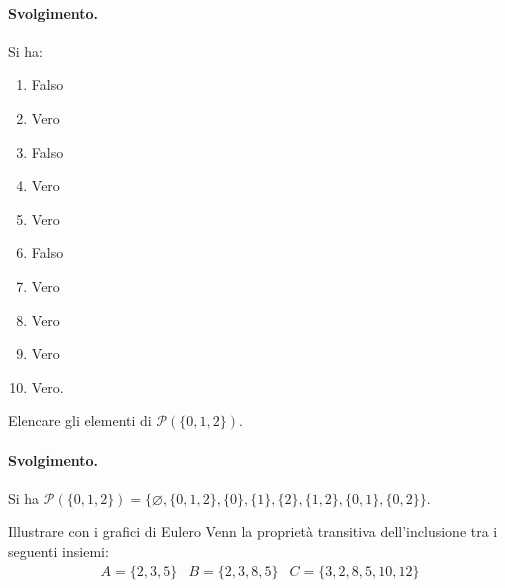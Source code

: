 \paragraph{Svolgimento.} Si ha:
\begin{enumerate}
	\item Falso
	\item Vero
	\item Falso
	\item Vero
	\item Vero
	\item Falso
	\item Vero
	\item Vero
	\item Vero
	\item Vero. \hfill \blacksquare
\end{enumerate}
\begin{exsbox}
	Elencare gli elementi di $\mathcal{P}(\{0,1,2\})$.
\end{exsbox}
\paragraph{Svolgimento.}
Si ha $\mathcal{P}(\{0,1,2\})=\bigl\{ \varnothing, \{0,1,2\},\{ 0\},\{1\},\{2\},\{1,2\},\{0,1\},\{0,2\}   \bigr\} $.
\hfill \blacksquare

\begin{exsbox}
	Illustrare con i grafici di Eulero Venn la proprietà transitiva dell'inclusione tra i seguenti insiemi:
	\begin{displaymath}
		\begin{array}{lll}
			A = \{2,3,5\} & B= \{2,3,8,5\} & C = \{3,2,8,5,10,12\}
		\end{array}
	\end{displaymath}
\end{exsbox}
